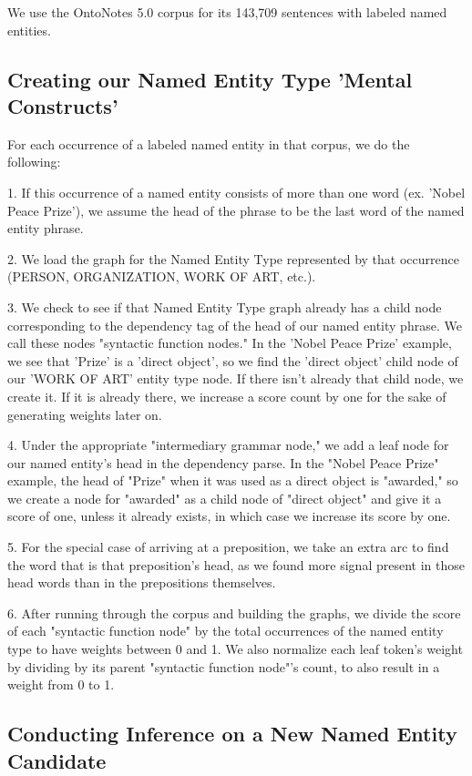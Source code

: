 \documentclass[11pt,a4paper]{article}
\begin{document}
We use the OntoNotes 5.0 corpus for its 143,709 sentences with labeled named entities.

\subsection{Creating our Named Entity Type 'Mental Constructs'}

For each occurrence of a labeled named entity in that corpus, we do the following:

1. If this occurrence of a named entity consists of more than one word (ex. 'Nobel Peace Prize'), we assume the head of the phrase to be the last word of the named entity phrase.

2. We load the graph for the Named Entity Type represented by that occurrence (PERSON, ORGANIZATION, WORK OF ART, etc.).

3. We check to see if that Named Entity Type graph already has a child node corresponding to the dependency tag of the head of our named entity phrase. We call these nodes "syntactic function nodes."  In the 'Nobel Peace Prize' example, we see that 'Prize' is a 'direct object', so we find the 'direct object' child node of our 'WORK OF ART' entity type node. If there isn't already that child node, we create it. If it is already there, we increase a score count by one for the sake of generating weights later on.

4. Under the appropriate "intermediary grammar node," we add a leaf node for our named entity's head in the dependency parse. In the "Nobel Peace Prize" example, the head of "Prize" when it was used as a direct object is "awarded," so we create a node for "awarded" as a child node of "direct object" and give it a score of one, unless it already exists, in which case we increase its score by one.

5. For the special case of arriving at a preposition, we take an extra arc to find the word that is that preposition's head, as we found more signal present in those head words than in the prepositions themselves.

6. After running through the corpus and building the graphs, we divide the score of each "syntactic function node" by the total occurrences of the named entity type to have weights between 0 and 1. We also normalize each leaf token's weight by dividing by its parent "syntactic function node"'s count, to also result in a weight from 0 to 1.

\subsection{Conducting Inference on a New Named Entity Candidate}
\end{document}
